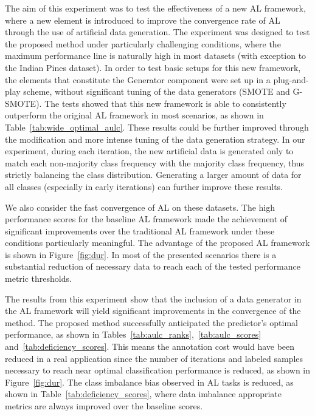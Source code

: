 \documentclass[parskip=full]{scrartcl}
\begin{document}
The aim of this experiment was to test the effectiveness of a new AL framework,
where a new element is introduced to improve the convergence rate of AL through
the use of artificial data generation. The experiment was designed to test the
proposed method under particularly challenging conditions, where the maximum
performance line is naturally high in most datasets (with exception to the
Indian Pines dataset). In order to test basic setups for this new framework,
the elements that constitute the Generator component were set up in a
plug-and-play scheme, without significant tuning of the data generators (SMOTE
and G-SMOTE). The tests showed that this new framework is able to consistently
outperform the original AL framework in most scenarios, as shown in
Table~\ref{tab:wide_optimal_aulc}. These results could be further improved
through the modification and more intense tuning of the data generation
strategy. In our experiment, during each iteration, the new artificial data is
generated only to match each non-majority class frequency with the majority
class frequency, thus strictly balancing the class distribution. Generating a
larger amount of data for all classes (especially in early iterations) can
further improve these results. 

We also consider the fast convergence of AL on these datasets. The high
performance scores for the baseline AL framework made the achievement of
significant improvements over the traditional AL framework under
these conditions particularly meaningful. The advantage of the proposed AL
framework is shown in Figure~\ref{fig:dur}. In most of the presented scenarios
there is a substantial reduction of necessary data to reach each of the tested
performance metric thresholds. 

The results from this experiment show that the inclusion of a data generator in
the AL framework will yield significant improvements in the convergence of the
method. The proposed method successfully anticipated the predictor's optimal
performance, as shown in Tables~\ref{tab:aulc_ranks},~\ref{tab:aulc_scores}
and~\ref{tab:deficiency_scores}. This means the annotation cost would have been
reduced in a real application since the number of iterations and labeled
samples necessary to reach near optimal classification performance is reduced,
as shown in Figure~\ref{fig:dur}. The class imbalance bias observed in AL tasks
is reduced, as shown in Table~\ref{tab:deficiency_scores}, where data
imbalance appropriate metrics are always improved over the baseline scores.



\end{document}
